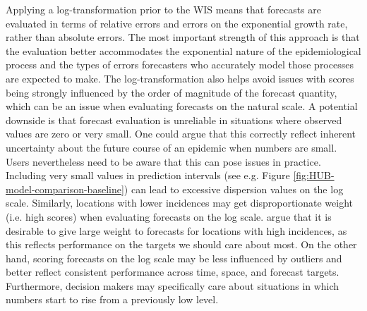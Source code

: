 \documentclass{article}
\begin{document}
Applying a log-transformation prior to the WIS means that forecasts are evaluated in terms of relative errors and errors on the exponential growth rate, rather than absolute errors. The most important strength of this approach is that the evaluation better accommodates the exponential nature of the epidemiological process and the types of errors forecasters who accurately model those processes are expected to make. The log-transformation also helps avoid issues with scores being strongly influenced by the order of magnitude of the forecast quantity, which can be an issue when evaluating forecasts on the natural scale. 
A potential downside is that forecast evaluation is unreliable in situations where observed values are zero or very small. One could argue that this correctly reflect inherent uncertainty about the future course of an epidemic when numbers are small. Users nevertheless need to be aware that this can pose issues in practice. Including very small values in prediction intervals (see e.g. Figure \ref{fig:HUB-model-comparison-baseline}) can lead to excessive dispersion values on the log scale. 
Similarly, locations with lower incidences may get disproportionate weight (i.e. high scores) when evaluating forecasts on the log scale. \cite{bracherEvaluatingEpidemicForecasts2021} argue that it is desirable to give large weight to forecasts for locations with high incidences, as this reflects performance on the targets we should care about most. On the other hand, scoring forecasts on the log scale may be less influenced by outliers and better reflect consistent performance across time, space, and forecast targets. Furthermore, decision makers may specifically care about situations in which numbers start to rise from a previously low level.
\end{document}
